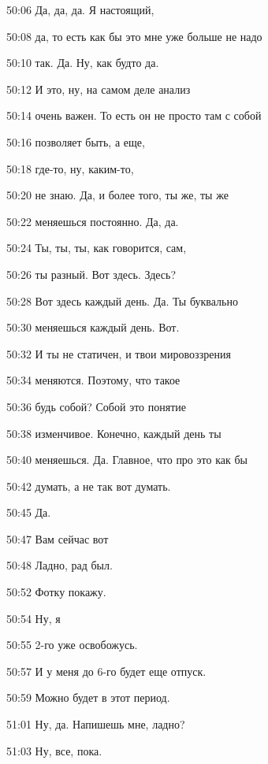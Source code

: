 50:06
Да, да, да. Я настоящий,

50:08
да, то есть как бы это мне уже больше не надо

50:10
так. Да. Ну, как будто да.

50:12
И это, ну, на самом деле анализ

50:14
очень важен. То есть он не просто там с собой

50:16
позволяет быть, а еще,

50:18
где-то, ну, каким-то,

50:20
не знаю. Да, и более того, ты же, ты же

50:22
меняешься постоянно. Да, да.

50:24
Ты, ты, ты, как говорится, сам,

50:26
ты разный. Вот здесь. Здесь?

50:28
Вот здесь каждый день. Да. Ты буквально

50:30
меняешься каждый день. Вот.

50:32
И ты не статичен, и твои мировоззрения

50:34
меняются. Поэтому, что такое

50:36
будь собой? Собой это понятие

50:38
изменчивое. Конечно, каждый день ты

50:40
меняешься. Да. Главное, что про это как бы

50:42
думать, а не так вот думать.

50:45
Да.

50:47
Вам сейчас вот

50:48
Ладно, рад был.

50:52
Фотку покажу.

50:54
Ну, я

50:55
2-го уже освобожусь.

50:57
И у меня до 6-го будет еще отпуск.

50:59
Можно будет в этот период.

51:01
Ну, да. Напишешь мне, ладно?

51:03
Ну, все, пока.
